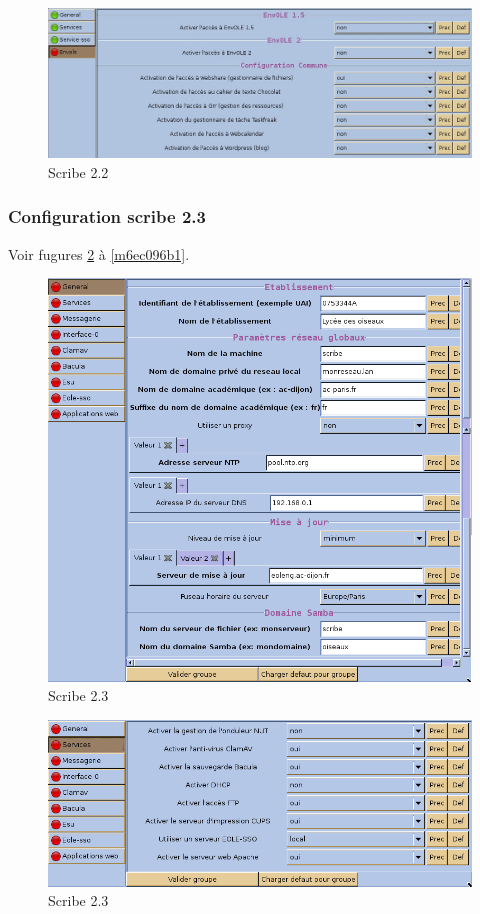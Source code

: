 \documentclass{article}
\makeatletter
\def\maxwidth{\ifdim\Gin@nat@width>\linewidth\linewidth
\else\Gin@nat@width\fi}
\let\Oldincludegraphics\includegraphics
\renewcommand{\includegraphics}[1]{\Oldincludegraphics[width=\maxwidth]{#1}}
\makeatother
\begin{document}
\begin{figure}[htbp]
\centering
\includegraphics{scribe_html_m44b07c21.jpg}
\caption{Scribe 2.2 \label{m44b07c21}}
\end{figure}

\subsubsection{Configuration scribe 2.3}

Voir fugures \ref{5dc039bc} à \ref{m6ec096b1}.

\begin{figure}[htbp]
\centering
\includegraphics{scribe_html_5dc039bc.png}
\caption{Scribe 2.3 \label{5dc039bc}}
\end{figure}

\begin{figure}[htbp]
\centering
\includegraphics{scribe_html_m291b378c.png}
\caption{Scribe 2.3}
\end{figure}
\end{document}
